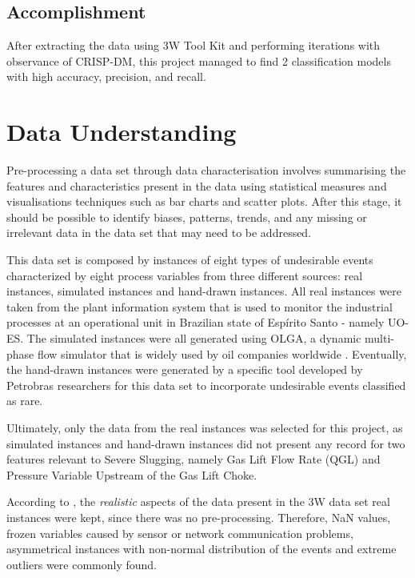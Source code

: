 \documentclass{article}
\begin{document}
\subsection{Accomplishment}
After extracting the data using 3W Tool Kit and performing iterations with observance of CRISP-DM, this project managed to find 2 classification models with high accuracy, precision, and recall.

\section{Data Understanding}

Pre-processing a data set through data characterisation involves summarising the features and characteristics present in the data using statistical measures and visualisations techniques such as bar charts and scatter plots. After this stage, it should be possible to identify biases, patterns, trends, and any missing or irrelevant data in the data set that may need to be addressed.

This data set is composed by instances of eight types of undesirable events characterized by eight process variables from three different sources: real instances, simulated instances and hand-drawn instances. All real instances were taken from the plant information system that is used to monitor the industrial processes at an operational unit in Brazilian state of Espírito Santo - namely UO-ES. The simulated instances were all generated using OLGA, a dynamic multi-phase flow simulator that is widely used by oil companies worldwide \parencite{andreolli2016introduccao}. Eventually, the hand-drawn instances were generated by a specific tool developed by Petrobras researchers for this data set to incorporate undesirable events classified as rare.

Ultimately, only the data from the real instances was selected for this project, as simulated instances and hand-drawn instances did not present any record for two features relevant to Severe Slugging, namely Gas Lift Flow Rate (QGL) and Pressure Variable Upstream of the Gas Lift Choke.

According to \textcite{revvargas2019}, the \emph{realistic} aspects of the data present in the 3W data set real instances were kept, since there was no pre-processing. Therefore, NaN values, frozen variables caused by sensor or network communication problems, asymmetrical instances with non-normal distribution of the events and extreme outliers were commonly found. 
\end{document}
